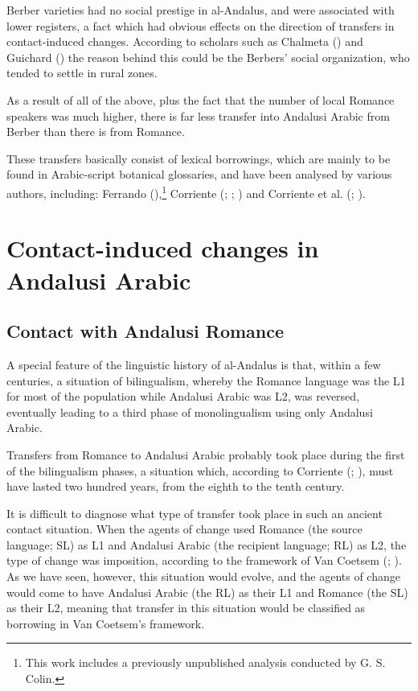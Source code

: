 \documentclass[output=paper,modfonts,nonflat]{langsci/langscibook}
\begin{document}
Berber varieties had no social prestige in al-Andalus, and were associated with lower registers, a fact which had obvious effects on the direction of transfers in contact-induced changes. According to scholars such as Chalmeta (\citeyear[160]{Chalmeta2003}) and Guichard (\citeyear{Guichard1995}) the reason behind this could be the Berbers’ social organization, who tended to settle in rural zones. 

As a result of all of the above, plus the fact that the number of local Romance speakers was much higher, there is far less transfer into Andalusi Arabic from Berber than there is from Romance. 

These transfers basically consist of lexical borrowings, which are mainly to be found in Arabic-script botanical glossaries,  and have been analysed by various authors, including: Ferrando (\citeyear{Ferrando1997}),\footnote{This work includes a previously unpublished analysis conducted by G. S. Colin.} Corriente (\citeyear{Corriente1981}; \citeyear{Corriente1998Berber}; \citeyear{Corriente2002}) and Corriente et al. (\citeyear{CorrientePereiraVicente2017}; \citeyear{CorrientePereiraVicenteforthcoming}).


\section{Contact-induced changes in Andalusi Arabic} 

\subsection{Contact with Andalusi Romance}

A special feature of the linguistic history of al-Andalus is that, within a few centuries, a situation of bilingualism, whereby the Romance language was the L1 for most of the population while Andalusi Arabic was L2, was reversed, eventually leading to a third phase of monolingualism using only Andalusi Arabic. 

Transfers from Romance to Andalusi Arabic probably took place during the first of the bilingualism phases, a situation which, according to Corriente (\citeyear{Corriente2005};  \citeyear{Corriente2008}), must have lasted two hundred years, from the eighth to the tenth century. 

It is difficult to diagnose what type of transfer took place in such an ancient contact situation. When the agents of change used Romance (the source language; SL) as L1 and Andalusi Arabic (the recipient language; RL) as L2, the type of change was imposition, according to the framework of Van Coetsem (\citeyear{VanCoetsem1988}; \citeyear{VanCoetsem2000}). As we have seen, however, this situation would evolve, and the agents of change would come to have Andalusi Arabic (the RL) as their L1 and Romance (the SL) as their L2, meaning that transfer in this situation would be classified as borrowing in Van Coetsem’s framework. 
\end{document}
